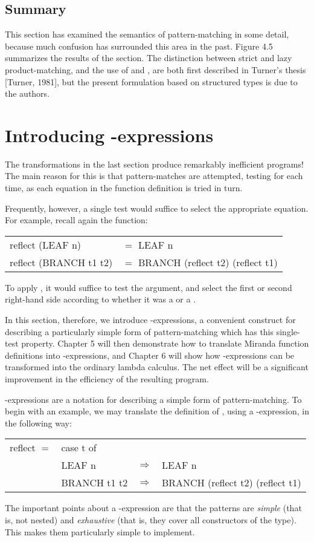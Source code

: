 \subsection{Summary}
This section has examined the semantics of pattern-matching in some detail, because much confusion has surrounded this area in the past. Figure 4.5 summarizes the results of the section. The distinction between strict and lazy product-matching, and the use of \ml{\fatbar} and , are both first described in Turner's thesis [Turner, 1981], but the present formulation based on structured types is due to the authors.

\section{Introducing -expressions}
The transformations in the last section produce remarkably inefficient programs! The main reason for this is that pattern-matches are attempted, testing for  each time, as each equation in the function definition is tried in turn.

Frequently, however, a single test would suffice to select the appropriate equation. For example, recall again the  function:
\begin{mlcoded}
    \begin{tabular}{ll}
    reflect (LEAF n) &$=$ LEAF n \\
    reflect (BRANCH t1 t2) &$=$ BRANCH (reflect t2) (reflect t1)
    \end{tabular}
\end{mlcoded}
To apply , it would suffice to test the argument, and select the first or second right-hand side according to whether it was a  or a .

In this section, therefore, we introduce -expressions, a convenient construct for describing a particularly simple form of pattern-matching which has this single-test property. Chapter 5 will then demonstrate how to translate Miranda function definitions into -expressions, and Chapter 6 will show how -expressions can be transformed into the ordinary lambda calculus. The net effect will be a significant improvement in the efficiency of the resulting program.

-expressions are a notation for describing a simple form of pattern-matching. To begin with an example, we may translate the definition of , using a -expression, in the following way:
\begin{mlcoded}
    \begin{tabular}{llll}
    reflect $=$ \tlb{t} &case t of \\
    &LEAF n  &$\Rightarrow$  &LEAF n \\
    &BRANCH t1 t2 &$\Rightarrow$ &BRANCH (reflect t2) (reflect t1)
    \end{tabular}
\end{mlcoded}
The important points about a -expression are that the patterns are \textit{simple} (that is, not nested) and \textit{exhaustive} (that is, they cover all constructors of the type). This makes them particularly simple to implement.

